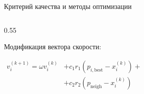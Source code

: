 \begin{frame}{Критерий качества и методы оптимизации}
\begin{columns}[T]
\begin{column}{0.55\textwidth}
\begin{tcolorbox}
				\vspace{0.15cm}
				{\footnotesize Модификация вектора скорости:}
				{\centering $\displaystyle
					\begin{aligned}
						v_i^{(k+1)} = \omega v_i^{(k)} &+ c_1 r_1 \left( p_{i,\mathrm{best}} - x_i^{(k)} \right) + \\
						&+ c_2 r_2 \left( p_{\mathrm{neigh}} - x_i^{(k)} \right)
					\end{aligned}$ \par}
			\end{tcolorbox}
		\end{column}
		
	\end{columns}
	
	\vfill
\end{frame}